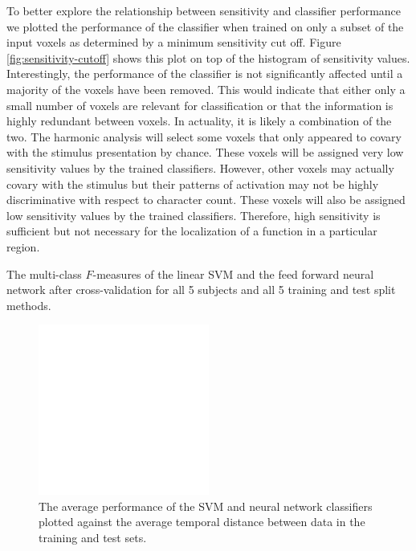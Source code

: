 \documentclass[final]{article}
\begin{document}
To better explore the relationship between sensitivity and classifier performance we plotted the performance of the classifier when trained on only a subset of the input voxels as determined by a minimum sensitivity cut off.
Figure \ref{fig:sensitivity-cutoff} shows this plot on top of the histogram of sensitivity values.
Interestingly, the performance of the classifier is not significantly affected until a majority of the voxels have been removed.
This would indicate that either only a small number of voxels are relevant for classification or that the information is highly redundant between voxels.
In actuality, it is likely a combination of the two.
The harmonic analysis will select some voxels that only appeared to covary with the stimulus presentation by chance.
These voxels will be assigned very low sensitivity values by the trained classifiers.
However, other voxels may actually covary with the stimulus but their patterns of activation may not be highly discriminative with respect to character count.
These voxels will also be assigned low sensitivity values by the trained classifiers.
Therefore, high sensitivity is sufficient but not necessary for the localization of a function in a particular region.

\begin{table}[!htbp]
\centering

\caption{The multi-class $F$-measures of the linear SVM and the feed forward neural network after cross-validation for all 5 subjects and all 5 training and test split methods. }
\label{tab:results}
\end{table}

\begin{figure}[!htbp]
\centering
\includegraphics[width=0.5\textwidth]{figures/placeholder}
\caption{The average performance of the SVM and neural network classifiers plotted against the average temporal distance between data in the training and test sets.}
\label{fig:performance-verse-temporal-distance}
\end{figure}
\end{document}

